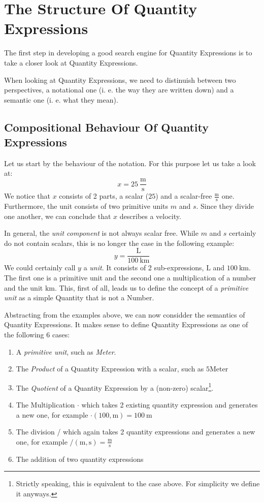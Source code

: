 \section{The Structure Of Quantity Expressions}
\label{sec:strucqe}

The first step in developing a good search engine for Quantity Expressions is to take a closer look at Quantity Expressions.

When looking at Quantity Expressions, we need to distinuish between two perspectives, a notational one (i. e. the way they are written down) and a semantic one (i. e. what they mean).

\subsection{Compositional Behaviour Of Quantity Expressions}
Let us start by the behaviour of the notation. For this purpose let us take a look at:
\[x = 25\ \frac{\text{m}}{\text{s}}\]
We notice that $x$ consists of 2 parts, a scalar ($25$) and a scalar-free $\frac{\text{m}}{\text{s}}$ one. Furthermore, the unit consists of two primitive units $m$ and $s$. Since they divide one another, we can conclude that $x$ describes a velocity.

In general, the \textit{unit component} is not always scalar free. While $m$ and $s$ certainly do not contain scalars, this is no longer the case in the following example:
\[y = \frac{\text{L}}{100\ \text{km}}\]
We could certainly call $y$ a \textit{unit}. It consists of 2 sub-expressions, $\text{L}$ and $100\ \text{km}$. The first one is a primitive unit and the second one a multiplication of a number and the unit $\text{km}$. This, first of all, leads us to define the concept of a \textit{primitive unit} as a simple Quantity that is not a Number.

Abstracting from the examples above, we can now considder the semantics of Quantity Expressions. It makes sense to define Quantity Expressions as one of the following 6 cases: 
\begin{enumerate}
  \item A \textit{primitive unit}, such as \textit{Meter}.
  \item The \textit{Product} of a Quantity Expression with a scalar, such as $5 \text{Meter}$
  \item The \textit{Quotient} of a Quantity Expression by a (non-zero) scalar\footnote{Strictly speaking, this is equivalent to the case above. For simplicity we define it anyways. }.
  \item The Multiplication $\cdot{}$ which takes 2 existing quantity expression and generates a new one, for example $\cdot \left(100, \text{m} \right) = 100\ \text{m}$
  \item The division / which again takes 2 quantity expressions and generates a new one, for example $\text{/} (\text{m}, \text{s}) = \frac{\text{m}}{\text{s}}$
  \item The addition of two quantity expressions
\end{enumerate}

